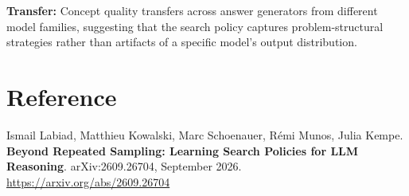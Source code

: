\documentclass[10pt,twocolumn]{article}
\begin{document}
\textbf{Transfer:} Concept quality transfers across answer generators from
different model families, suggesting that the search policy captures
problem-structural strategies rather than artifacts of a specific model's
output distribution.

\section*{Reference}

Ismail Labiad, Matthieu Kowalski, Marc Schoenauer, R\'emi Munos, Julia Kempe.
\textbf{Beyond Repeated Sampling: Learning Search Policies for LLM Reasoning}.
arXiv:2609.26704, September 2026.\\
\url{https://arxiv.org/abs/2609.26704}
\end{document}
